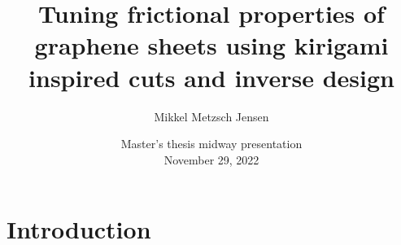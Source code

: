\documentclass[
	10pt, %
]{beamer}
\title[Master's thesis midway presentation]{Tuning frictional properties of graphene sheets using kirigami inspired cuts and inverse design} %
\author[Mikkel Metzsch Jensen]{Mikkel Metzsch Jensen} %
\institute[UiO]{Universitetet i Oslo} %
\date[\today]{Master's thesis midway presentation \\ November 29, 2022} %
\begin{document}

\begin{frame}
	\titlepage %
\end{frame}



	



\section{Introduction}
\end{document}
